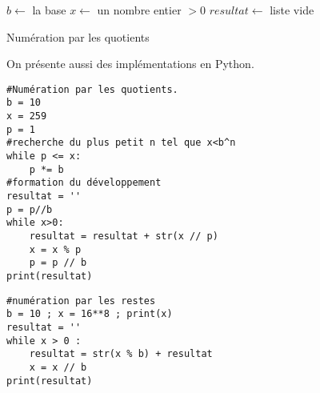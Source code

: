 \begin{algorithm}
 $b \leftarrow $ la base \;
 $x \leftarrow $ un nombre entier $>0$ \;
 $resultat \leftarrow$ liste vide \;
 \caption{Numération par les quotients}
 \label{Numrem} 
\end{algorithm}

On présente aussi des implémentations en Python.
\begin{verbatim}
#Numération par les quotients.
b = 10
x = 259
p = 1
#recherche du plus petit n tel que x<b^n
while p <= x:
    p *= b
#formation du développement
resultat = ''
p = p//b
while x>0:
    resultat = resultat + str(x // p)
    x = x % p
    p = p // b
print(resultat) 
\end{verbatim}

\begin{verbatim}
#numération par les restes
b = 10 ; x = 16**8 ; print(x)
resultat = ''
while x > 0 :
    resultat = str(x % b) + resultat
    x = x // b
print(resultat)  
\end{verbatim}

\printindex

 